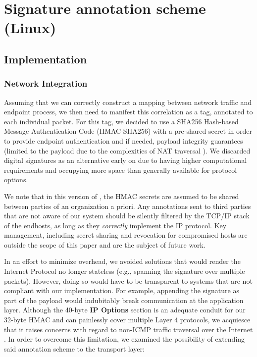 \section{Signature annotation scheme (Linux)}
\label{sign:linux}

\subsection{Implementation}
\label{sign:linux:implementation}

\subsubsection{Network Integration}

Assuming that we can correctly construct a mapping between network traffic and endpoint process, we then need to manifest this correlation as a tag, annotated to each individual packet. For this tag, we decided to use a SHA256 Hash-based Message Authentication Code (HMAC-SHA256) with a pre-shared secret in order to provide endpoint authentication and if needed, payload integrity guarantees (limited to the payload due to the complexities of NAT traversal \cite{rfc6314}). We discarded digital signatures as an alternative early on due to having higher computational requirements and occupying more space than generally available for protocol options.

We note that in this version of \daf{}, the HMAC secrets are assumed to be shared between parties of an organization a priori. Any annotations sent to third parties that are not aware of our system should be silently filtered by the TCP/IP stack of the endhosts, as long as they \textit{correctly} implement the IP protocol. Key management, including secret sharing and revocation for compromised hosts are outside the scope of this paper and are the subject of future work.

In an effort to minimize overhead, we avoided solutions that would render the Internet Protocol no longer stateless (e.g., spanning the signature over multiple packets). However, doing so would have to be transparent to systems that are not compliant with our implementation. For example, appending the signature as part of the payload would indubitably break communication at the application layer. Although the 40-byte \textbf{IP Options} section is an adequate conduit for our 32-byte HMAC and can painlessly cover multiple Layer 4 protocols, we acquiesce that it raises concerns with regard to non-ICMP traffic traversal over the Internet \cite{fonseca2005ip, mantuchiroiuevaluationnetworkextensions, kazemian2012header, goodchild2017record}. In order to overcome this limitation, we examined the possibility of extending said annotation scheme to the transport layer:

